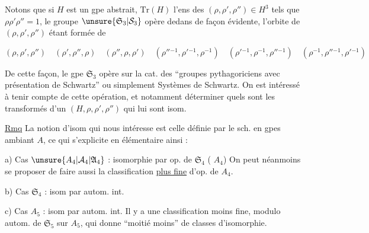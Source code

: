 
Notons que si $H$ est un gpe abstrait, $\mathrm{Tr}(H)$ l'ens des $(\rho,\rho',\rho'')\in H^3$ tels que $\rho\rho'\rho''=1$, le groupe $\unsure{\mathfrak S_3|\mathcal S_3}$ opère dedans de façon évidente, l'orbite de $(\rho,\rho',\rho'')$  étant formée de

\[
(\rho,\rho',\rho'')\quad(\rho',\rho'',\rho)\quad(\rho'',\rho,\rho')\quad
(\rho''{}^{-1},\rho'{}^{-1},\rho^{-1})\quad
(\rho'{}^{-1},\rho^{-1},\rho''{}^{-1})\quad
(\rho^{-1},\rho''{}^{-1},\rho'{}^{-1})
\]

De cette façon, le gpe $\mathfrak S_3$ opère sur la cat. des ``groupes pythagoriciens avec présentation de Schwartz'' ou simplement Systèmes de Schwartz. On est intéressé à tenir compte de cette opération, et notamment déterminer quels sont les transformés  d'un $(H,\rho,\rho',\rho'')$ qui lui sont isom. 

\uline{Rmq} La notion d'isom qui nous intéresse est celle définie par le sch. en gpes ambiant $A$, ce qui s'explicite en  élémentaire ainsi :

a) Cas $\unsure{A_4|\mathcal A_4|\mathfrak A_4}$ : isomorphie par op. de $\mathfrak S_4$  ( $A_4$) On peut néanmoins se proposer de faire aussi la classification \uline{plus fine}  d'op. de $A_4$.

b) Cas $\mathfrak S_4$ : isom par autom. int.

c) Cas $A_5$ : isom par autom. int. Il y a une classification moins fine, modulo autom. de $\mathfrak S_5$ sur $A_5$, qui donne ``moitié moins'' de classes d'isomorphie.

